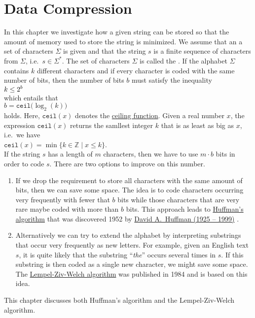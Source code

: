 \chapter{Data Compression}
In this chapter we investigate how a given string can be stored so that the amount of memory used to store the
string is minimized.   We assume that an a set of characters $\Sigma$ is given and that the string $s$ is a finite
sequence of characters from $\Sigma$, i.e.~$s \in \Sigma^*$.  The set of characters $\Sigma$ is called the
.  If the alphabet $\Sigma$ contains $k$ different characters and if every character is coded
with the same number of bits, then the number of bits $b$ must satisfy the inequality
\\[0.2cm]
\hspace*{1.3cm}
$\displaystyle k \leq 2^b$ 
\\[0.2cm]
which entails that 
\\[0.2cm]
\hspace*{1.3cm}
$b = \mathtt{ceil}\bigl(\log_2(k)\bigr)$
\\[0.2cm]
holds.  Here, $\mathtt{ceil}(x)$ denotes the
\href{https://en.wikipedia.org/wiki/Floor_and_ceiling_functions}{ceiling function}.  Given a real number $x$,
the expression $\mathtt{ceil}(x)$ returns the samllest integer $k$ that is as least as big as $x$, i.e.~we have
\\[0.2cm]
\hspace*{1.3cm}
$\mathtt{ceil}(x) = \min \{ k \in \mathbb{Z} \mid x \leq k \}$. 
\\[0.2cm]
If the string $s$ has a length of $m$ characters, then we have to use $m \cdot b$ bits in order to code $s$. 
There are two options to improve on this number.
\begin{enumerate}
\item If we drop the requirement to store all characters with the same amount of bits, then we can save some space.
      The idea is to code characters occurring very frequently with fewer that $b$ bits while those characters
      that are very rare maybe coded with more than $b$ bits.  This approach leads to 
      \href{https://en.wikipedia.org/wiki/Huffman_coding}{Huffman's algorithm} that was discovered 1952 by 
      \href{https://en.wikipedia.org/wiki/David_A._Huffman}{David A.~Huffman (1925 -- 1999)} \cite{huffman:52}.
\item Alternatively we can try to extend the alphabet by interpreting substrings that occur very frequently as
      new letters.  For example, given an English text $s$, it is quite likely that the substring 
      ``\emph{the}'' occurs several times in $s$.  If this substring is then coded as a single new character,
      we might save some space.  The 
      \href{https://en.wikipedia.org/wiki/Lempel-Ziv-Welch}{Lempel-Ziv-Welch algorithm} 
      \cite{ziv:77,ziv:78,welch:84} was published in 1984 and is based on this idea.

\end{enumerate}
This chapter discusses both Huffman's algorithm and the Lempel-Ziv-Welch algorithm.

